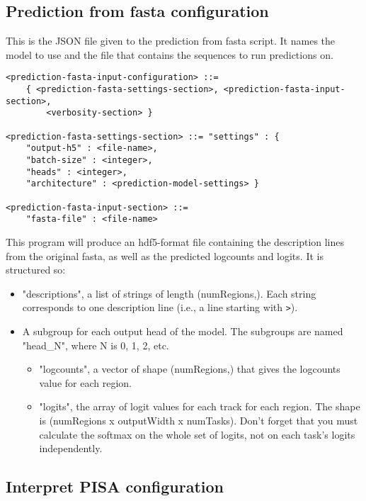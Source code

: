 \documentclass{article}
\begin{document}
\subsection{Prediction from fasta configuration}
This is the JSON file given to the prediction from fasta script. It names the model to use and the file that contains the sequences to run predictions on.

\begin{lstlisting}
<prediction-fasta-input-configuration> ::=
    { <prediction-fasta-settings-section>, <prediction-fasta-input-section>,
        <verbosity-section> }

<prediction-fasta-settings-section> ::= "settings" : {
    "output-h5" : <file-name>,
    "batch-size" : <integer>,
    "heads" : <integer>,
    "architecture" : <prediction-model-settings> }

<prediction-fasta-input-section> ::=
    "fasta-file" : <file-name>
\end{lstlisting}

This program will produce an hdf5-format file containing the description lines from the original fasta, as well as the predicted logcounts and logits.
It is structured so:

\begin{itemize}
    \item "descriptions", a list of strings of length (numRegions,). Each string corresponds to one description line (i.e., a line starting with \texttt{>}). 
    \item A subgroup for each output head of the model. The subgroups are named "head\_N", where N is 0, 1, 2, etc. 
        \begin{itemize}
            \item "logcounts", a vector of shape (numRegions,) that gives the logcounts value for each region. 
            \item "logits", the array of logit values for each track for each region. The shape is (numRegions x outputWidth x numTasks). Don't forget that you must calculate the softmax on the whole set of logits, not on each task's logits independently.
        \end{itemize} 
\end{itemize}

        


\subsection{Interpret PISA configuration}
\end{document}
